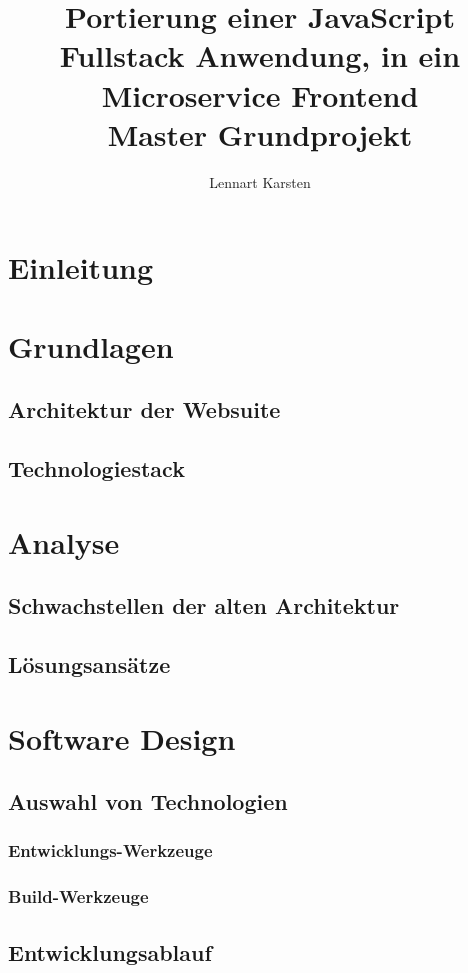 \documentclass[11pt,a4paper]{article}
\author{Lennart Karsten}
\title{Portierung einer JavaScript Fullstack Anwendung, in ein Microservice Frontend\\
	\vspace{3mm}\large Master Grundprojekt
}
\date{}
\begin{document}
	\maketitle
	\tableofcontents
	\newpage
	
	
	\section{Einleitung}
	
	\section{Grundlagen}
	\subsection{Architektur der Websuite}
	\subsection{Technologiestack}
	
	\section{Analyse}
	\subsection{Schwachstellen der alten Architektur}
	\subsection{Lösungsansätze}
	
	\section{Software Design}
	\subsection{Auswahl von Technologien}
	\subsubsection{Entwicklungs-Werkzeuge}
	\subsubsection{Build-Werkzeuge}
	\subsection{Entwicklungsablauf}
\end{document}
